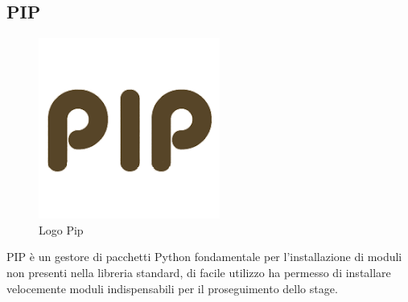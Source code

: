 \subsection{PIP}
\begin{figure}[H]
	\begin{center} \includegraphics[scale=0.2]{figures/pip}
		\caption[Logo Pip]{Logo Pip}
	\end{center}
\end{figure}
PIP è un gestore di pacchetti Python fondamentale per l'installazione di moduli non presenti nella libreria standard, di facile utilizzo ha permesso di installare velocemente moduli indispensabili per il proseguimento dello stage.